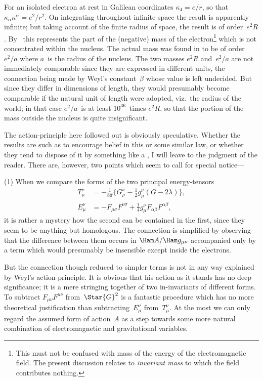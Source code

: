 \documentclass[12pt]{book}
\begin{document}
For an isolated electron at rest in Galilean coordinates $\kappa_{4} = e/r$, so that
$\kappa_{\alpha} \kappa^{\alpha} = e^{2}/r^{2}$. On integrating throughout infinite space the result is apparently
infinite; but taking account of the finite radius of space, the result is of order~$e^{2}R$.
By~ this represents the part of the (negative) mass of the electron\footnote
  {This must not be confused with mass of the energy of the electromagnetic field. The present
  discussion relates to \emph{invariant mass} to which the field contributes nothing.}
which is not concentrated within the nucleus. The actual mass was found in
 to be of order~$e^{2}/a$ where $a$~is the radius of the nucleus. The two masses
$e^{2}R$ and~$e^{2}/a$ are not immediately comparable since they are expressed in
different units, the connection being made by Weyl's constant~$\beta$ whose value
is left undecided. But since they differ in dimensions of length, they would
presumably become comparable if the natural unit of length were adopted,
viz.\ the radius of the world; in that case $e^{2}/a$~is at least $10^{36}$~times $e^{2}R$, so that
the portion of the mass outside the nucleus is quite insignificant.

The action-principle here followed out is obviously speculative. Whether
the results are such as to encourage belief in this or some similar law, or whether
they tend to dispose of it by something like a , I will
leave to the judgment of the reader. There are, however, two points which
seem to call for special notice---

(1) When we compare the forms of the two principal energy-tensors
\begin{align*}
  T_{\mu}^{\nu} &= -\frac{1}{8\pi} \bigl\{G_{\mu}^{\nu} - \tfrac{1}{2} g_{\mu}^{\nu} (G - 2\lambda)\bigr\}, \\
  E_{\mu}^{\nu} &= -F_{\mu\sigma} F^{\nu\sigma} + \tfrac{1}{4} g_{\mu}^{\nu} F_{\alpha\beta} F^{\alpha\beta},
\end{align*}
it is rather a mystery how the second can be contained in the first, since they
seem to be anything but homologous. The connection is simplified by observing
that the difference between them occurs in $\Ham A/\Ham g_{\mu\nu}$  accompanied only
by a term which would presumably be insensible except inside the electrons.

But the connection though reduced to simpler terms is not in any way
explained by Weyl's action-principle. It is obvious that his action as it stands
has no deep significance; it is a mere stringing together of two in-invariants
of different forms. To subtract $F_{\mu\nu}F^{\mu\nu}$ from~$\Star{G}^{2}$ is a fantastic procedure which
has no more theoretical justification than subtracting~$E_{\mu}^{\nu}$ from~$T_{\mu}^{\nu}$. At the
most we can only regard the assumed form of action~$A$ as a step towards some
more natural combination of electromagnetic and gravitational variables.
\end{document}
